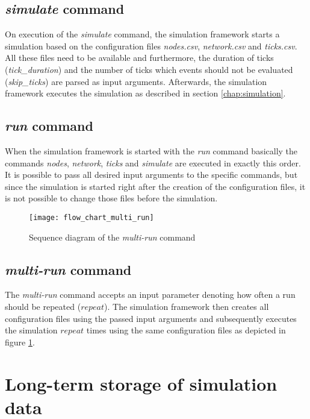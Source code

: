 \subsection{\textit{simulate} command} \label{chap:simulate_command}

On execution of the \textit{simulate} command, the simulation framework starts a simulation based on the configuration files \textit{nodes.csv}, \textit{network.csv} and \textit{ticks.csv}.
All these files need to be available and furthermore, the duration of ticks (\textit{tick\_duration}) and the number of ticks which events should not be evaluated (\textit{skip\_ticks}) are parsed as input arguments.
Afterwards, the simulation framework executes the simulation as described in section \ref{chap:simulation}.

\subsection{\textit{run} command} \label{chap:run_command}

When the simulation framework is started with the \textit{run} command basically the commands \textit{nodes}, \textit{network}, \textit{ticks} and \textit{simulate} are executed in exactly this order.
It is possible to pass all desired input arguments to the specific commands, but since the simulation is started right after the creation of the configuration files, it is not possible to change those files before the simulation.

\begin{figure}[t]
\texttt{[image: flow\_chart\_multi\_run]}
\centering
\caption{Sequence diagram of the \textit{multi-run} command}
\label{fig:flow_chart_multi_run}
\end{figure}

\subsection{\textit{multi-run} command} \label{chap:multi_run_command}

The \textit{multi-run} command accepts an input parameter denoting how often a run should be repeated ($repeat$).
The simulation framework then creates all configuration files using the passed input arguments and subsequently executes the simulation $repeat$ times using the same configuration files as depicted in figure \ref{fig:flow_chart_multi_run}.

\section{Long-term storage of simulation data}

